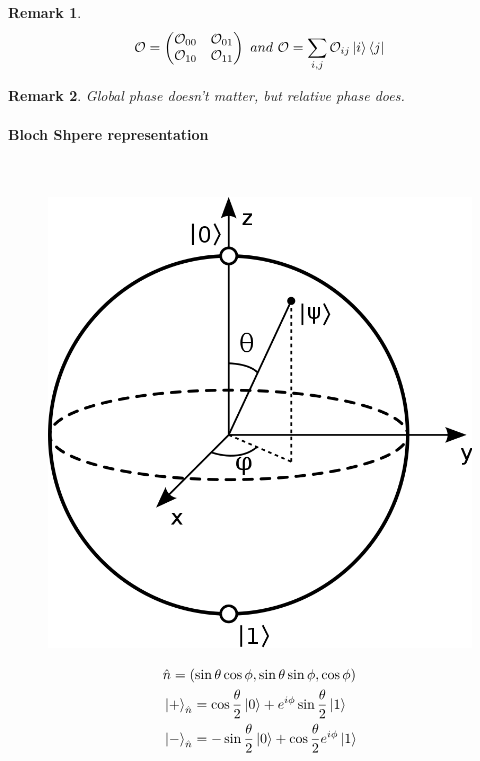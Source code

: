 \documentclass[]{article}
\newtheorem*{remark}{Remark}
\theoremstyle{nonumberplain}
\begin{document}
\begin{remark}
\[
\mathcal{O}=
\begin{pmatrix}
	\mathcal{O}_{00} & \mathcal{O}_{01} \\
	\mathcal{O}_{10} & \mathcal{O}_{11} \\
\end{pmatrix}
\ and \ 
\mathcal{O} = \sum^{}_{i,j} \mathcal{O}_{ij}\ket{i}\bra{j}
\] 
\end{remark}
\begin{remark}
Global phase doesn't matter, but relative phase does.
\end{remark}
\newpage
\paragraph{Bloch Shpere representation}%
\ \\
\begin{figure}[!hbt]
\centering
\includegraphics[scale=0.1]{graph/2.png}
\end{figure}
\begin{equation*}
\begin{aligned}
	& \hat{n}=(\sin{\theta}\cos{\phi},\sin{\theta}\sin{\phi},\cos{\phi})\\
	& \ket{+}_{\hat{n}}=\cos{\frac{\theta}{2}}\ket{0}+e^{i\phi}\sin{\frac{\theta}{2}} \ket{1} \\
	& \ket{-}_{\hat{n}}=-\sin{\frac{\theta}{2}}\ket{0}+\cos{\frac{\theta}{2}} e^{i\phi}\ket{1}
\end{aligned}
\end{equation*}
\end{document}
